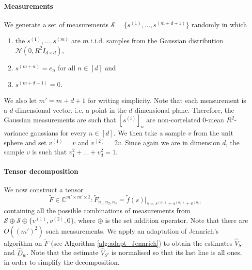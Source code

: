 \paragraph{Measurements} We generate a set of measurements $\mathcal{S}=\{s^{(1)},\ldots,s^{(m+d+1)}\}$ randomly in which
\begin{enumerate}
    \item the $s^{(1)},\ldots,s^{(m)}$ are $m$ i.i.d. samples from the Gaussian distribution $\mathcal{N}(0,R^2I_{d\times d})$,
    \item $s^{(m+n)}=e_n$ for all $n\in[d]$ and
    \item $s^{(m+d+1)}=0$.
\end{enumerate}
We also let $m'=m+d+1$ for writing simplicity. Note that each measurement is a $d$-dimensional vector, i.e. a point in the $d$-dimensional plane. Therefore, the Gaussian measurements are such that $[s^{(i)}]_n$ are non-correlated 0-mean $R^2$-variance gaussians for every $n\in[d]$. We then take a sample $v$ from the unit sphere and set $v^{(1)}=v$ and $v^{(2)}=2v$. Since again we are in dimension $d$, the sample $v$ is such that $v_1^2+\ldots+v_d^2=1$.
\paragraph{Tensor decomposition} We now construct a tensor $$\tilde{F}\in\mathbb{C}^{m'\times m'\times 3}:\tilde{F}_{n_1,n_2,n_3}=\tilde{f}(s)|_{s=s^{(n_1)}+s^{(n_2)}+v^{(n_3)}}$$ containing all the possible combinations of measurements from $\mathcal{S}\oplus\mathcal{S}\oplus\{v^{(1)},v^{(2)},0\}$, where $\oplus$ is the set addition operator. Note that there are $O((m')^2)$ such measurements. We apply an adaptation of Jennrich's algorithm on $\tilde{F}$ (see Algorithm \ref{alg:adapt_Jennrich}) to obtain the estimates $\widehat{V}_{S'}$ and $\widehat{D}_w$. Note that the estimate $\widehat{V}_{S'}$ is normalised so that its last line is all ones, in order to simplify the decomposition.
